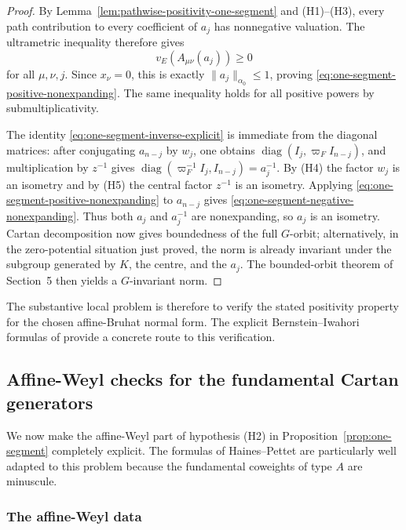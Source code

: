 \documentclass[12pt]{article}
\theoremstyle{definition}
\theoremstyle{remark}
\begin{document}
\begin{proof}
By Lemma~\ref{lem:pathwise-positivity-one-segment} and
\textup{(H1)}--\textup{(H3)}, every path contribution to every coefficient
of \(a_j\) has nonnegative valuation.  The ultrametric inequality therefore
gives
\[
 v_E(A_{\mu\nu}(a_j))\geq0
\]
for all \(\mu,\nu,j\).  Since \(x_\nu=0\), this is exactly
\(\|a_j\|_{\alpha_0}\leq1\), proving
\eqref{eq:one-segment-positive-nonexpanding}.  The same inequality holds for
all positive powers by submultiplicativity.

The identity \eqref{eq:one-segment-inverse-explicit} is immediate from the
diagonal matrices: after conjugating \(a_{n-j}\) by \(w_j\), one obtains
\(\operatorname{diag}(I_j,\varpi_F I_{n-j})\), and multiplication by
\(z^{-1}\) gives
\(\operatorname{diag}(\varpi_F^{-1}I_j,I_{n-j})=a_j^{-1}\).
By \textup{(H4)} the factor \(w_j\) is an isometry and by \textup{(H5)} the
central factor \(z^{-1}\) is an isometry.  Applying
\eqref{eq:one-segment-positive-nonexpanding} to \(a_{n-j}\) gives
\eqref{eq:one-segment-negative-nonexpanding}.  Thus both \(a_j\) and
\(a_j^{-1}\) are nonexpanding, so \(a_j\) is an isometry.  Cartan
decomposition now gives boundedness of the full \(G\)-orbit; alternatively,
in the zero-potential situation just proved, the norm is already invariant
under the subgroup generated by \(K\), the centre, and the \(a_j\).
The bounded-orbit theorem of Section~5 then yields a \(G\)-invariant norm.
\end{proof}

The substantive local problem is therefore to verify the stated positivity
property for the chosen affine-Bruhat normal form.  The explicit
Bernstein--Iwahori formulas of \cite{HainesPettet2002} provide a concrete
route to this verification.


\subsection{Affine-Weyl checks for the fundamental Cartan generators}

We now make the affine-Weyl part of hypothesis \textup{(H2)} in
Proposition~\ref{prop:one-segment} completely explicit.  The formulas of
Haines--Pettet \cite{HainesPettet2002} are particularly well adapted to this
problem because the fundamental coweights of type \(A\) are minuscule.

\subsubsection{The affine-Weyl data}
\end{document}
